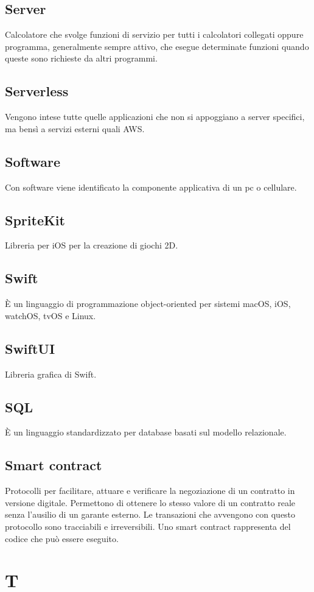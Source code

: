 \subsection{Server} Calcolatore che svolge funzioni di servizio per tutti i calcolatori collegati oppure programma, generalmente sempre attivo, che esegue determinate funzioni quando queste sono richieste da altri programmi.
\subsection{Serverless} Vengono intese tutte quelle applicazioni che non si appoggiano a server specifici, ma bensì a servizi esterni quali AWS.
\subsection{Software} Con software viene identificato la componente applicativa di un pc o cellulare.
\subsection{SpriteKit} Libreria per iOS per la creazione di giochi 2D.
\subsection{Swift} È un linguaggio di programmazione object-oriented per sistemi macOS, iOS, watchOS, tvOS e Linux.
\subsection{SwiftUI} Libreria grafica di Swift.
\subsection{SQL} È un linguaggio standardizzato per database basati sul modello relazionale.
\subsection{Smart contract} Protocolli per facilitare, attuare e verificare la negoziazione di un contratto in versione digitale.
Permettono di ottenere lo stesso valore di un contratto reale senza l'ausilio di un garante esterno. Le transazioni che avvengono con questo protocollo sono tracciabili e irreversibili. Uno smart contract rappresenta del codice che può essere eseguito.
\newpage \section{T}
